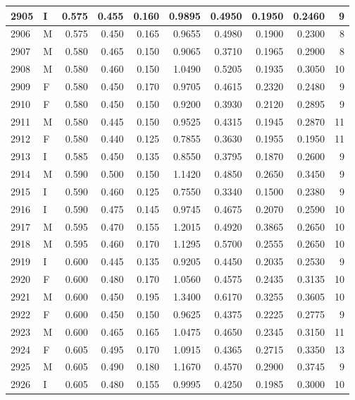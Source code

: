 \documentclass[9pt,twocolumn,twoside,]{pnas-new}
\begin{document}
\begin{tabular}{l|l|r|r|r|r|r|r|r|r}
\hline
2905 & I & 0.575 & 0.455 & 0.160 & 0.9895 & 0.4950 & 0.1950 & 0.2460 & 9\\
\hline
2906 & M & 0.575 & 0.450 & 0.165 & 0.9655 & 0.4980 & 0.1900 & 0.2300 & 8\\
\hline
2907 & M & 0.580 & 0.465 & 0.150 & 0.9065 & 0.3710 & 0.1965 & 0.2900 & 8\\
\hline
2908 & M & 0.580 & 0.460 & 0.150 & 1.0490 & 0.5205 & 0.1935 & 0.3050 & 10\\
\hline
2909 & F & 0.580 & 0.450 & 0.170 & 0.9705 & 0.4615 & 0.2320 & 0.2480 & 9\\
\hline
2910 & F & 0.580 & 0.450 & 0.150 & 0.9200 & 0.3930 & 0.2120 & 0.2895 & 9\\
\hline
2911 & M & 0.580 & 0.445 & 0.150 & 0.9525 & 0.4315 & 0.1945 & 0.2870 & 11\\
\hline
2912 & F & 0.580 & 0.440 & 0.125 & 0.7855 & 0.3630 & 0.1955 & 0.1950 & 11\\
\hline
2913 & I & 0.585 & 0.450 & 0.135 & 0.8550 & 0.3795 & 0.1870 & 0.2600 & 9\\
\hline
2914 & M & 0.590 & 0.500 & 0.150 & 1.1420 & 0.4850 & 0.2650 & 0.3450 & 9\\
\hline
2915 & I & 0.590 & 0.460 & 0.125 & 0.7550 & 0.3340 & 0.1500 & 0.2380 & 9\\
\hline
2916 & I & 0.590 & 0.475 & 0.145 & 0.9745 & 0.4675 & 0.2070 & 0.2590 & 10\\
\hline
2917 & M & 0.595 & 0.470 & 0.155 & 1.2015 & 0.4920 & 0.3865 & 0.2650 & 10\\
\hline
2918 & M & 0.595 & 0.460 & 0.170 & 1.1295 & 0.5700 & 0.2555 & 0.2650 & 10\\
\hline
2919 & I & 0.600 & 0.445 & 0.135 & 0.9205 & 0.4450 & 0.2035 & 0.2530 & 9\\
\hline
2920 & F & 0.600 & 0.480 & 0.170 & 1.0560 & 0.4575 & 0.2435 & 0.3135 & 10\\
\hline
2921 & M & 0.600 & 0.450 & 0.195 & 1.3400 & 0.6170 & 0.3255 & 0.3605 & 10\\
\hline
2922 & F & 0.600 & 0.450 & 0.150 & 0.9625 & 0.4375 & 0.2225 & 0.2775 & 9\\
\hline
2923 & M & 0.600 & 0.465 & 0.165 & 1.0475 & 0.4650 & 0.2345 & 0.3150 & 11\\
\hline
2924 & F & 0.605 & 0.495 & 0.170 & 1.0915 & 0.4365 & 0.2715 & 0.3350 & 13\\
\hline
2925 & M & 0.605 & 0.490 & 0.180 & 1.1670 & 0.4570 & 0.2900 & 0.3745 & 9\\
\hline
2926 & I & 0.605 & 0.480 & 0.155 & 0.9995 & 0.4250 & 0.1985 & 0.3000 & 10\\

\end{tabular}
\end{document}
